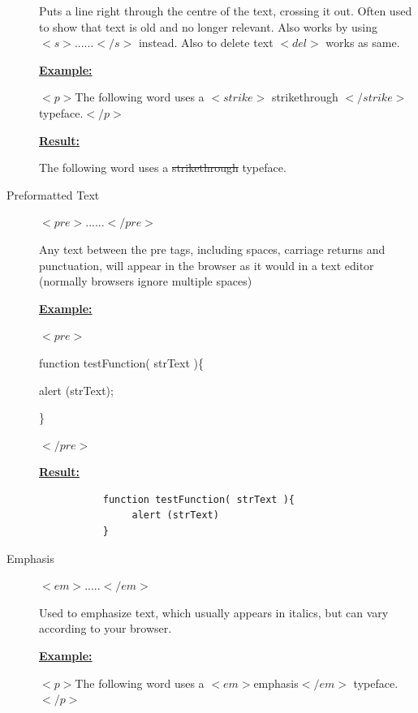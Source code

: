 \documentclass[11pt,a4paper]{article}
\begin{document}
\begin{description}
\hspace{1cm}Puts a line right through the centre of the text, crossing it out. Often used to show that text is old and no longer relevant. Also works by using $<s>...... </s>$ instead. Also to delete text $<del>$ works as same.\

\underline{\textbf{Example:}}

\hspace{1cm}$<p>$The following word uses a $<strike>$ strikethrough $</strike>$ typeface.$</p>$

\underline{\textbf{Result:}}

\hspace{1cm}The following word uses a \st{strikethrough} typeface.\

\item[Preformatted Text] $<pre>......</pre>$

\hspace{1cm} Any text between the pre tags, including spaces, carriage returns and punctuation, will appear in the browser as it would in a text editor (normally browsers ignore multiple spaces)\

\underline{\textbf{Example:}}

\hspace{2cm}$<pre>$\

\hspace{3cm}function testFunction( strText )\{\

\hspace{3.8cm} alert (strText);\

\hspace{3cm}\}\

\hspace{2cm}$</pre>$

\underline{\textbf{Result:}}
\begin{verbatim}
           function testFunction( strText ){
                alert (strText)
           }
\end{verbatim}

\item[Emphasis] $<em>.....</em>$

\hspace{1cm}Used to emphasize text, which usually appears in italics, but can vary according to your browser.\

\underline{\textbf{Example:}}

\hspace{1cm}$<p>$The following word uses a $<em>$emphasis$</em>$ typeface.$</p>$


\end{description}
\end{document}

